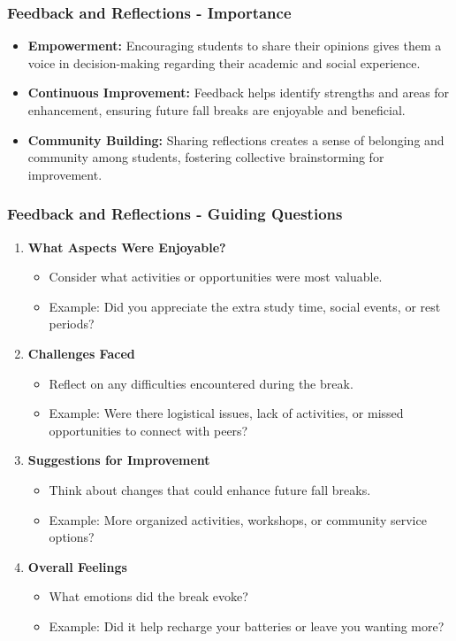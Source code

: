 \documentclass[aspectratio=169]{beamer}
\begin{document}
\begin{frame}[fragile]
    \frametitle{Feedback and Reflections - Importance}
    \begin{itemize}
        \item \textbf{Empowerment:} Encouraging students to share their opinions gives them a voice in decision-making regarding their academic and social experience.
        \item \textbf{Continuous Improvement:} Feedback helps identify strengths and areas for enhancement, ensuring future fall breaks are enjoyable and beneficial.
        \item \textbf{Community Building:} Sharing reflections creates a sense of belonging and community among students, fostering collective brainstorming for improvement.
    \end{itemize}
\end{frame}

\begin{frame}[fragile]
    \frametitle{Feedback and Reflections - Guiding Questions}
    \begin{enumerate}
        \item \textbf{What Aspects Were Enjoyable?}
            \begin{itemize}
                \item Consider what activities or opportunities were most valuable.
                \item Example: Did you appreciate the extra study time, social events, or rest periods?
            \end{itemize}

        \item \textbf{Challenges Faced}
            \begin{itemize}
                \item Reflect on any difficulties encountered during the break.
                \item Example: Were there logistical issues, lack of activities, or missed opportunities to connect with peers?
            \end{itemize}

        \item \textbf{Suggestions for Improvement}
            \begin{itemize}
                \item Think about changes that could enhance future fall breaks.
                \item Example: More organized activities, workshops, or community service options?
            \end{itemize}

        \item \textbf{Overall Feelings}
            \begin{itemize}
                \item What emotions did the break evoke?
                \item Example: Did it help recharge your batteries or leave you wanting more?
            \end{itemize}
    \end{enumerate}
\end{frame}
\end{document}
